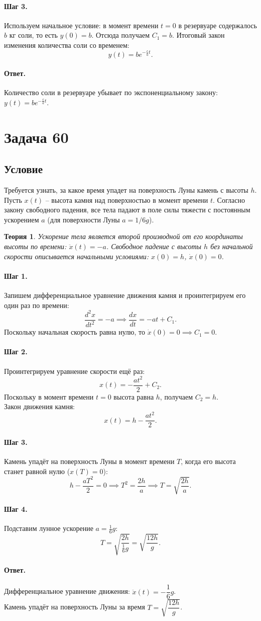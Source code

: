 \documentclass[12pt,a4paper]{article}
\theoremstyle{solution}
\newtheorem*{theory}{Теория}
\newcommand{\task}[1]{\newpage\section*{Задача #1}}
\newcommand{\answer}{\paragraph{Ответ.}}
\newcommand{\step}[1]{\paragraph{Шаг #1.}}
\begin{document}
\step{3} Используем начальное условие: в момент времени $t = 0$ в резервуаре содержалось $b$ кг соли, то есть $y(0) = b$. Отсюда получаем $C_1 = b$.
Итоговый закон изменения количества соли со временем:
\[
y(t) = b e^{-\frac{c}{a} t}.
\]

\answer
Количество соли в резервуаре убывает по экспоненциальному закону: $y(t) = b e^{-\frac{c}{a} t}$.

\task{60}
\subsection*{Условие}
Требуется узнать, за какое время упадет на поверхность Луны камень с высоты $h$. Пусть $x(t)$ – высота камня над поверхностью в момент времени $t$. Согласно закону свободного падения, все тела падают в поле силы тяжести с постоянным ускорением $a$ (для поверхности Луны $a = 1/6 g$).

\begin{theory}
Ускорение тела является второй производной от его координаты высоты по времени: $\ddot{x}(t) = -a$. Свободное падение с высоты $h$ без начальной скорости описывается начальными условиями: $x(0) = h$, $\dot{x}(0) = 0$.
\end{theory}

\step{1} Запишем дифференциальное уравнение движения камня и проинтегрируем его один раз по времени:
\[
\frac{d^2 x}{dt^2} = -a \implies \frac{dx}{dt} = -at + C_1.
\]
Поскольку начальная скорость равна нулю, то $\dot{x}(0) = 0 \implies C_1 = 0$.

\step{2} Проинтегрируем уравнение скорости ещё раз:
\[
x(t) = -\frac{a t^2}{2} + C_2.
\]
Поскольку в момент времени $t = 0$ высота равна $h$, получаем $C_2 = h$. \\
Закон движения камня:
\[
x(t) = h - \frac{a t^2}{2}.
\]

\step{3} Камень упадёт на поверхность Луны в момент времени $T$, когда его высота станет равной нулю ($x(T) = 0$):
\[
h - \frac{a T^2}{2} = 0 \implies T^2 = \frac{2h}{a} \implies T = \sqrt{\frac{2h}{a}}.
\]

\step{4} Подставим лунное ускорение $a = \frac{1}{6} g$:
\[
T = \sqrt{\frac{2h}{\frac{1}{6}g}} = \sqrt{\frac{12h}{g}}.
\]

\answer
Дифференциальное уравнение движения: $\ddot{x}(t) = -\dfrac{1}{6}g$.\\
Камень упадёт на поверхность Луны за время $T = \sqrt{\dfrac{12h}{g}}$.
\end{document}
